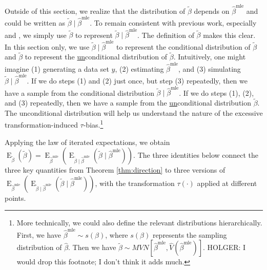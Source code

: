 \documentclass[11pt]{article}
\DeclareMathOperator*{\E}{\text{E}}
\begin{document}
Outside of this section, we realize that the distribution of $\tilde{\beta}$ depends on $\hat{\beta}^\text{mle}$ and could be written as $\tilde{\beta} \mid \hat{\beta}^\text{mle}$. To remain consistent with previous work, especially \cite{KingTomzWittenberg2000} and \cite{Herron1999}, we simply use $\tilde{\beta}$ to represent $\tilde{\beta} \mid \hat{\beta}^\text{mle}$. The definition of $\tilde{\beta}$ makes this clear. In this section only, we use $\tilde{\beta} \mid \hat{\beta}^\text{mle}$ to represent the conditional distribution of $\tilde{\beta}$ and $\tilde{\beta}$ to represent the \underline{un}conditional distribution of $\tilde{\beta}$. Intuitively, one might imagine (1) generating a data set $y$, (2) estimating $\hat{\beta}^\text{mle}$, and (3) simulating $\tilde{\beta} \mid \hat{\beta}^\text{mle}$. If we do steps (1) and (2) just once, but step (3) repeatedly, then we have a sample from the conditional distribution $\tilde{\beta} \mid \hat{\beta}^\text{mle}$. If we do steps (1), (2), and (3) repeatedly, then we have a sample from the \underline{un}conditional distribution $\tilde{\beta}$. The unconditional distribution will help us understand the nature of the excessive transformation-induced $\tau$-bias.\footnote{More technically, we could also define the relevant distributions hierarchically. First, we have $\hat{\beta}^\text{mle} \sim s(\beta)$, where $s(\beta)$ represents the sampling distribution of $\hat{\beta}$. Then we have $\tilde{\beta} \sim MVN \left[ \hat{\beta}^{\text{mle}}, \hat{V} \left( \hat{\beta}^{\text{mle}} \right) \right]$. {\color{red} HOLGER: I would drop this footnote; I don't think it adds much.}}

Applying the law of iterated expectations, we obtain $\E_{\tilde{\beta}} \left( \tilde{\beta} \right) = \E_{\hat{\beta}^\text{mle}}\left( \E_{\tilde{\beta} \mid \hat{\beta}^\text{mle}} (\tilde{\beta} \mid \hat{\beta}^\text{mle}) \right)$. The three identities below connect the three key quantities from Theorem \ref{thm:direction} to three versions of $\E_{\hat{\beta}^\text{mle}}\left( \E_{\tilde{\beta} \mid \hat{\beta}^\text{mle}} (\tilde{\beta} \mid \hat{\beta}^\text{mle}) \right)$, with the transformation $\tau(\cdot)$ applied at different points.
\end{document}
